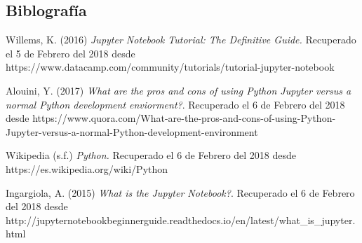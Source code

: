 \documentclass[a4paper]{article}
\begin{document}
\begin{enumerate}
\section{Biblografía}
Willems, K. (2016) \textit{Jupyter Notebook Tutorial: The Definitive Guide.} Recuperado el 5 de Febrero del 2018 desde https://www.datacamp.com/community/tutorials/tutorial-jupyter-notebook

\bigskip

Alouini, Y. (2017) \textit{What are the pros and cons of using Python Jupyter versus a normal Python development enviorment?}. Recuperado el 6 de Febrero del 2018 desde https://www.quora.com/What-are-the-pros-and-cons-of-using-Python-Jupyter-versus-a-normal-Python-development-environment

\bigskip

Wikipedia (s.f.) \textit{Python.} Recuperado el 6 de Febrero del 2018 desde https://es.wikipedia.org/wiki/Python

\bigskip

Ingargiola, A. (2015) \textit{What is the Jupyter Notebook?}. Recuperado el 6 de Febrero del 2018 desde http://jupyter\-notebook\-beginner\-guide.readthedocs.io/en/latest/what\_is\_jupyter.html




\end{enumerate}
\end{document}

